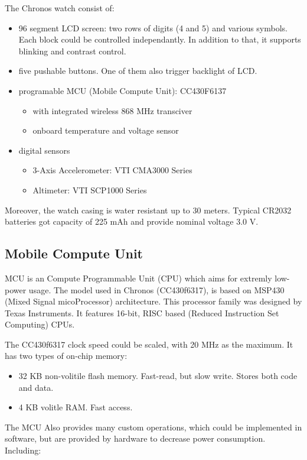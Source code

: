 The Chronos watch consist of:
\begin{itemize}
  \item 96 segment LCD screen: two rows of digits (4 and 5) and various symbols. Each block could be controlled independantly. In addition to that, it supports blinking and contrast control.
  \item five pushable buttons. One of them also trigger backlight of LCD.
  \item programable MCU (Mobile Compute Unit): CC430F6137
\begin{itemize}
    \item with integrated wireless 868 MHz transciver
    \item onboard temperature and voltage sensor
\end{itemize}
  \item digital sensors
\begin{itemize}
    \item 3-Axis Accelerometer: VTI CMA3000 Series
    \item Altimeter: VTI SCP1000 Series
\end{itemize}
\end{itemize}

Moreover, the watch casing is water resistant up to 30 meters.
Typical CR2032 batteries got capacity of 225 mAh and provide nominal voltage 3.0 V.

\subsection{Mobile Compute Unit}
MCU is an Compute Programmable Unit (CPU) which aims for extremly low-power usage.
The model used in Chronos (CC430f6317), is based on MSP430 (Mixed Signal micoProcessor) architecture.
This processor family was designed by Texas Instruments.
It features 16-bit, RISC based (Reduced Instruction Set Computing) CPUs.

The CC430f6317 clock speed could be scaled, with 20 MHz as the maximum. It has two types of on-chip memory:
\begin{itemize}
  \item 32 KB non-volitile flash memory. Fast-read, but slow write. Stores both code and data.
  \item 4 KB volitle RAM. Fast access. 
\end{itemize}

The MCU Also provides many custom operations, which could be implemented in software, but are provided by hardware to decrease power consumption. Including:

